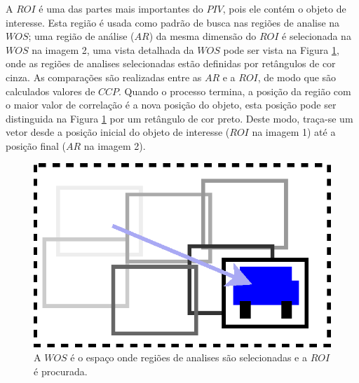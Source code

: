 A $ROI$ é uma das partes mais importantes do $PIV$, pois ele contém o objeto de interesse. 
Esta região é usada como padrão de busca nas regiões de analise na $WOS$;
uma região de análise ($AR$) da mesma dimensão do $ROI$ é selecionada na $WOS$ na imagem 2,
uma vista detalhada da $WOS$ pode ser vista na Figura \ref{fig:WOSdivided}, onde as regiões 
de analises selecionadas estão definidas por retângulos de cor cinza.
As comparações são realizadas entre as $AR$ e a $ROI$, de modo que são 
calculados valores de $CCP$. Quando o processo termina, a posição da região com o maior valor
de correlação é a nova posição do objeto, esta posição pode ser distinguida na Figura \ref{fig:WOSdivided}
por um retângulo de cor preto. Deste modo, traça-se um vetor desde a posição inicial do objeto 
de interesse ($ROI$ na imagem 1) até a posição final ($AR$ na imagem 2).
\begin{figure}[H]
\includegraphics[width=0.8\columnwidth]{images/WOSdivided.eps}
\caption{A $WOS$ é o espaço onde regiões de analises são selecionadas e a $ROI$ é procurada.}
\label{fig:WOSdivided}
\end{figure}
